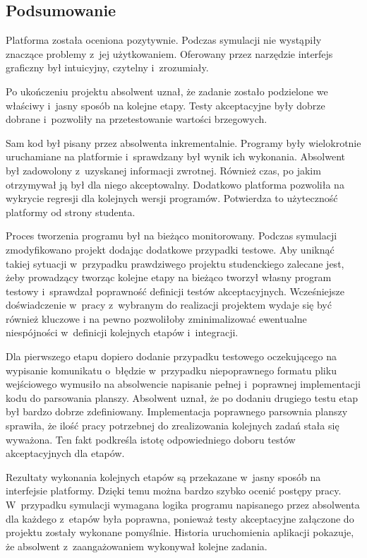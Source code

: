 \subsection{Podsumowanie}

Platforma została oceniona pozytywnie.
Podczas symulacji nie wystąpiły znaczące problemy z~jej użytkowaniem.
Oferowany przez narzędzie interfejs graficzny był intuicyjny, czytelny i~zrozumiały.

Po ukończeniu projektu absolwent uznał, że zadanie zostało podzielone we właściwy i~jasny sposób na kolejne etapy.
Testy akceptacyjne były dobrze dobrane i~pozwoliły na przetestowanie wartości brzegowych.

Sam kod był pisany przez absolwenta inkrementalnie.
Programy były wielokrotnie uruchamiane na platformie i~sprawdzany był wynik ich wykonania.
Absolwent był zadowolony z~uzyskanej informacji zwrotnej.
Również czas, po jakim otrzymywał ją był dla niego akceptowalny.
Dodatkowo platforma pozwoliła na wykrycie regresji dla kolejnych wersji programów.
Potwierdza to użyteczność platformy od strony studenta.

Proces tworzenia programu był na bieżąco monitorowany.
Podczas symulacji zmodyfikowano projekt dodając dodatkowe przypadki testowe.
Aby uniknąć takiej sytuacji w~przypadku prawdziwego projektu studenckiego zalecane jest, żeby prowadzący tworząc kolejne etapy na bieżąco tworzył własny program testowy i~sprawdzał poprawność definicji testów akceptacyjnych.
Wcześniejsze doświadczenie w~pracy z~wybranym do realizacji projektem wydaje się być również kluczowe i na pewno pozwoliłoby zminimalizować ewentualne niespójności w~definicji kolejnych etapów i~integracji.

Dla pierwszego etapu dopiero dodanie przypadku testowego oczekującego na wypisanie komunikatu o~błędzie w~przypadku niepoprawnego formatu pliku wejściowego wymusiło na absolwencie napisanie pełnej i~poprawnej implementacji kodu do parsowania planszy.
Absolwent uznał, że po dodaniu drugiego testu etap był bardzo dobrze zdefiniowany.
Implementacja poprawnego parsownia planszy sprawiła, że ilość pracy potrzebnej do zrealizowania kolejnych zadań stała się wyważona.
Ten fakt podkreśla istotę odpowiedniego doboru testów akceptacyjnych dla etapów.

Rezultaty wykonania kolejnych etapów są przekazane w~jasny sposób na interfejsie platformy.
Dzięki temu można bardzo szybko ocenić postępy pracy.
W~przypadku symulacji wymagana logika programu napisanego przez absolwenta dla każdego z~etapów była poprawna, ponieważ testy akceptacyjne załączone do projektu zostały wykonane pomyślnie.
Historia uruchomienia aplikacji pokazuje, że absolwent z~zaangażowaniem wykonywał kolejne zadania.

